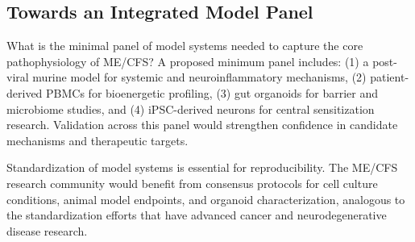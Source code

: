 \subsection{Towards an Integrated Model Panel}

\begin{open_question}
What is the minimal panel of model systems needed to capture the core pathophysiology of ME/CFS? A proposed minimum panel includes: (1) a post-viral murine model for systemic and neuroinflammatory mechanisms, (2) patient-derived PBMCs for bioenergetic profiling, (3) gut organoids for barrier and microbiome studies, and (4) iPSC-derived neurons for central sensitization research. Validation across this panel would strengthen confidence in candidate mechanisms and therapeutic targets.
\end{open_question}

Standardization of model systems is essential for reproducibility. The ME/CFS research community would benefit from consensus protocols for cell culture conditions, animal model endpoints, and organoid characterization, analogous to the standardization efforts that have advanced cancer and neurodegenerative disease research.


